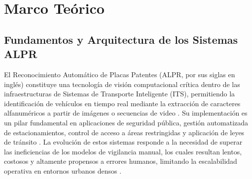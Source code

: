 %
%
%
%
%

\chapter{Marco Teórico}



\section{Fundamentos y Arquitectura de los Sistemas ALPR}

El Reconocimiento Automático de Placas Patentes (ALPR, por sus siglas en inglés) 
constituye una tecnología de visión computacional crítica dentro de las 
infraestructuras de Sistemas de Transporte Inteligente (ITS), permitiendo la 
identificación de vehículos en tiempo real mediante la extracción de caracteres 
alfanuméricos a partir de imágenes o secuencias de video 
\parencite{PDFRealTimeLicense2026, kuyunsaDeepLearningEnhancedAutomatic2025, 
larocaAdvancingMultinationalLicense2025}. 
Su implementación es un pilar fundamental en aplicaciones de seguridad pública, 
gestión automatizada de estacionamientos, control de acceso a áreas restringidas 
y aplicación de leyes de tránsito 
\parencite{buleuDeepLearningBasedSystem2025a, xuDeepLearningAlgorithms2026c, 
zherzdevLPRNetLicensePlate2018}. 
La evolución de estos sistemas responde a la necesidad de superar las ineficiencias 
de los modelos de vigilancia manual, los cuales resultan lentos, costosos y altamente 
propensos a errores humanos, limitando la escalabilidad operativa en entornos urbanos 
densos 
\parencite{meesadAdvancedDeepLearning2025a, wijayaEfficientLicensePlate2024, 
xuDeepLearningAlgorithms2026c}.

